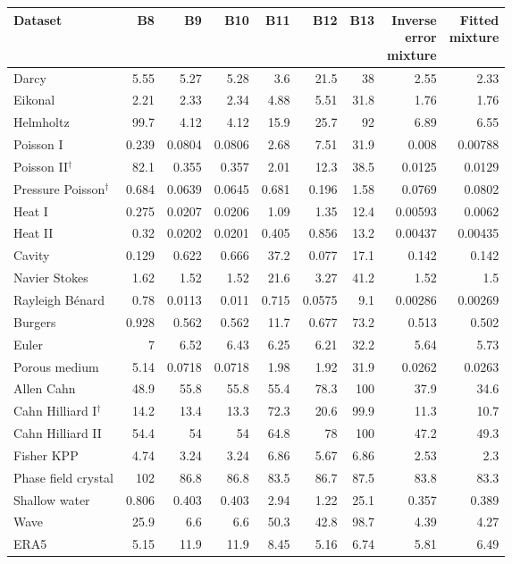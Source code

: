 \begin{tabular}{lrrrrrrrr}
\toprule
Dataset & B8 & B9 & B10 & B11 & B12 & B13 & \shortstack[r]{Inverse\\error\\mixture} & \shortstack[r]{Fitted\\mixture} \\
\midrule
Darcy & 5.55 & 5.27 & 5.28 & 3.6 & 21.5 & 38 & 2.55 & 2.33 \\
Eikonal & 2.21 & 2.33 & 2.34 & 4.88 & 5.51 & 31.8 & 1.76 & 1.76 \\
Helmholtz & 99.7 & 4.12 & 4.12 & 15.9 & 25.7 & 92 & 6.89 & 6.55 \\
Poisson I & 0.239 & 0.0804 & 0.0806 & 2.68 & 7.51 & 31.9 & 0.008 & 0.00788 \\
Poisson II$^{\dagger}$ & 82.1 & 0.355 & 0.357 & 2.01 & 12.3 & 38.5 & 0.0125 & 0.0129 \\
Pressure Poisson$^{\dagger}$ & 0.684 & 0.0639 & 0.0645 & 0.681 & 0.196 & 1.58 & 0.0769 & 0.0802 \\
Heat I & 0.275 & 0.0207 & 0.0206 & 1.09 & 1.35 & 12.4 & 0.00593 & 0.0062 \\
Heat II & 0.32 & 0.0202 & 0.0201 & 0.405 & 0.856 & 13.2 & 0.00437 & 0.00435 \\
Cavity & 0.129 & 0.622 & 0.666 & 37.2 & 0.077 & 17.1 & 0.142 & 0.142 \\
Navier Stokes & 1.62 & 1.52 & 1.52 & 21.6 & 3.27 & 41.2 & 1.52 & 1.5 \\
Rayleigh Bénard & 0.78 & 0.0113 & 0.011 & 0.715 & 0.0575 & 9.1 & 0.00286 & 0.00269 \\
Burgers & 0.928 & 0.562 & 0.562 & 11.7 & 0.677 & 73.2 & 0.513 & 0.502 \\
Euler & 7 & 6.52 & 6.43 & 6.25 & 6.21 & 32.2 & 5.64 & 5.73 \\
Porous medium & 5.14 & 0.0718 & 0.0718 & 1.98 & 1.92 & 31.9 & 0.0262 & 0.0263 \\
Allen Cahn & 48.9 & 55.8 & 55.8 & 55.4 & 78.3 & 100 & 37.9 & 34.6 \\
Cahn Hilliard I$^{\dagger}$ & 14.2 & 13.4 & 13.3 & 72.3 & 20.6 & 99.9 & 11.3 & 10.7 \\
Cahn Hilliard II & 54.4 & 54 & 54 & 64.8 & 78 & 100 & 47.2 & 49.3 \\
Fisher KPP & 4.74 & 3.24 & 3.24 & 6.86 & 5.67 & 6.86 & 2.53 & 2.3 \\
Phase field crystal & 102 & 86.8 & 86.8 & 83.5 & 86.7 & 87.5 & 83.8 & 83.3 \\
Shallow water & 0.806 & 0.403 & 0.403 & 2.94 & 1.22 & 25.1 & 0.357 & 0.389 \\
Wave & 25.9 & 6.6 & 6.6 & 50.3 & 42.8 & 98.7 & 4.39 & 4.27 \\
\midrule ERA5 & 5.15 & 11.9 & 11.9 & 8.45 & 5.16 & 6.74 & 5.81 & 6.49 \\
\bottomrule
\end{tabular}
